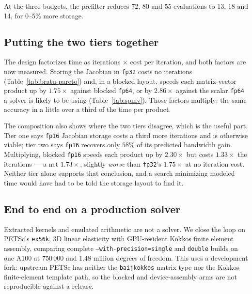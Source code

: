\documentclass[11pt]{article}
\begin{document}
At the three budgets, the prefilter reduces 72, 80 and 55 evaluations to 13, 18
and 14, for 0--5\% more storage.

\subsection{Putting the two tiers together}

The design factorizes time as iterations $\times$ cost per iteration, and both
factors are now measured. Storing the Jacobian in \texttt{fp32} costs no
iterations (Table~\ref{tab:bratu-pareto}) and, in a blocked layout, speeds each
matrix-vector product up by $1.75\times$ against blocked \texttt{fp64}, or by
$2.86\times$ against the scalar \texttt{fp64} a solver is likely to be using
(Table~\ref{tab:spmv}). Those factors multiply: the same accuracy in a little
over a third of the time per product.

The composition also shows where the two tiers disagree, which is the useful
part. Tier one says \texttt{fp16} Jacobian storage costs a third more iterations
and is otherwise viable; tier two says \texttt{fp16} recovers only $58\%$ of its
predicted bandwidth gain. Multiplying, blocked \texttt{fp16} speeds each product
up by
$2.30\times$ but costs $1.33\times$ the iterations --- a net $1.73\times$,
slightly \emph{worse} than \texttt{fp32}'s $1.75\times$ at no iteration cost.
Neither tier alone supports that conclusion, and a search minimizing modeled time
would have had to be told the storage layout to find it.

\subsection{End to end on a production solver}
\label{sec:e2e}

Extracted kernels and emulated arithmetic are not a solver. We close the loop on
PETSc's \texttt{ex56k}, 3D linear elasticity with GPU-resident Kokkos finite
element assembly, comparing complete \texttt{--with-precision=single} and
\texttt{double} builds on one A100 at $750\,000$ and $1.48$ million degrees of
freedom. This uses a development fork: upstream PETSc has neither the
\texttt{baijkokkos}
matrix type nor the Kokkos finite-element template path, so the blocked and
device-assembly arms are not
reproducible against a release.
\end{document}
